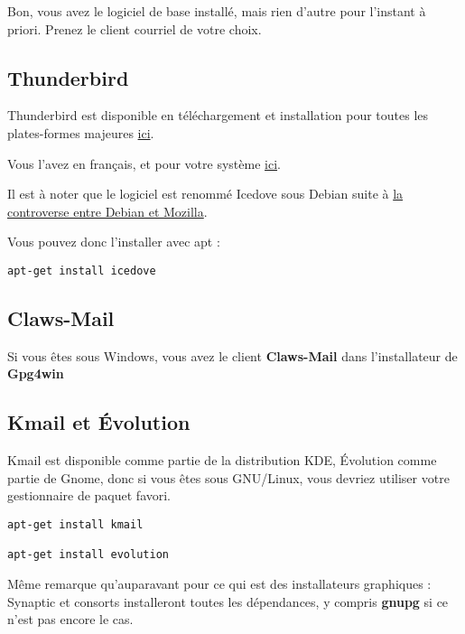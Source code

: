 Bon, vous avez le logiciel de base installé, mais rien d'autre pour
l'instant à priori. Prenez le client courriel de votre choix.

\subsection{Thunderbird}\label{thunderbird}

Thunderbird est disponible en téléchargement et installation pour toutes
les plates-formes majeures
\href{https://www.mozilla.org/en-US/thunderbird/all.html}{ici}.

Vous l'avez en français, et pour votre système
\href{https://www.mozilla.org/fr/thunderbird/}{ici}.

Il est à noter que le logiciel est renommé Icedove sous Debian suite à
\href{http://fr.wikipedia.org/wiki/Renommage_des_applications_de_Mozilla_par_Debian}{la
controverse entre Debian et Mozilla}.

Vous pouvez donc l'installer avec apt :

\begin{verbatim}
apt-get install icedove
\end{verbatim}

\subsection{Claws-Mail}\label{claws-mail}

Si vous êtes sous Windows, vous avez le client \textbf{Claws-Mail} dans
l'installateur de \textbf{Gpg4win}

\subsection{Kmail et Évolution}\label{kmail-et-uxe9volution}

Kmail est disponible comme partie de la distribution KDE, Évolution
comme partie de Gnome, donc si vous êtes sous GNU/Linux, vous devriez
utiliser votre gestionnaire de paquet favori.

\begin{verbatim}
apt-get install kmail

apt-get install evolution
\end{verbatim}

Même remarque qu'auparavant pour ce qui est des installateurs graphiques
: Synaptic et consorts installeront toutes les dépendances, y compris
\textbf{gnupg} si ce n'est pas encore le cas.


